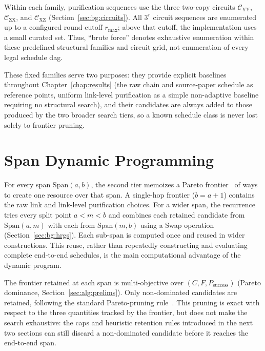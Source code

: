 Within each family, purification sequences use the three two-copy circuits $\mathcal C_{\mathrm{YY}}$, $\mathcal C_{\mathrm{ZX}}$, and $\mathcal C_{\mathrm{XZ}}$ (Section~\ref{sec:bg:circuits}). All $3^r$ circuit sequences are enumerated up to a configured round cutoff $r_{\max}$; above that cutoff, the implementation uses a small curated set. Thus, ``brute force'' denotes exhaustive enumeration within these predefined structural families and circuit grid, not enumeration of every legal schedule \Gls{dag}.

These fixed families serve two purposes: they provide explicit baselines throughout Chapter~\ref{chap:results} (the raw chain and source-paper schedule as reference points, uniform link-level purification as a simple non-adaptive baseline requiring no structural search), and their candidates are always added to those produced by the two broader search tiers, so a known schedule class is never lost solely to frontier pruning.

\section{Span Dynamic Programming}
\label{sec:alg:dp}

For every span $\mathrm{Span}(a,b)$, the second tier memoizes a Pareto frontier~\cite{Pareto2014Manual} of ways to create one resource over that span. A single-hop frontier ($b=a+1$) contains the raw link and link-level purification choices. For a wider span, the recurrence tries every split point $a<m<b$ and combines each retained candidate from $\mathrm{Span}(a,m)$ with each from $\mathrm{Span}(m,b)$ using a Swap operation (Section~\ref{sec:bg:hrgs}). Each sub-span is computed once and reused in wider constructions. This reuse, rather than repeatedly constructing and evaluating complete end-to-end schedules, is the main computational advantage of the dynamic program.

\clearpage

The frontier retained at each span is multi-objective over $(C,F,P_{\mathrm{success}})$ (Pareto dominance, Section~\ref{sec:alg:prelims}). Only non-dominated candidates are retained, following the standard Pareto-pruning rule~\cite{Ehrgott2005Multicriteria}. This pruning is exact with respect to the three quantities tracked by the frontier, but does not make the search exhaustive: the caps and heuristic retention rules introduced in the next two sections can still discard a non-dominated candidate before it reaches the end-to-end span.

